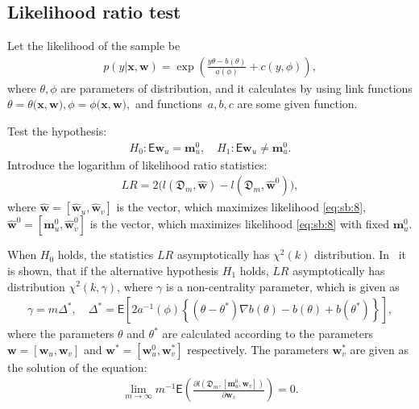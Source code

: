 \documentclass[
11pt,%
tightenlines,%
twoside,%
onecolumn,%
nofloats,%
nobibnotes,%
nofootinbib,%
superscriptaddress,%
noshowpacs,%
centertags]%
{revtex4}
\begin{document}
\subsection{Likelihood ratio test}\label{likelihood_test}
Let the likelihood of the sample be
\[
\label{eq:sb:8}
\begin{aligned}
	p(y|\mathbf{x},\textbf{w}) = \exp\left(\frac{y\theta- b(\theta)}{a(\phi)} + c\left(y, \phi\right)\right),
\end{aligned}
\]
where $\theta, \phi$ are parameters of distribution, and it calculates by using link functions $\theta=\theta\bigr(\textbf{x},\textbf{w}\bigr), \phi=\phi\bigr(\textbf{x},\textbf{w}\bigr),$ and functions~$a, b, c$ are some given function.

Test the hypothesis:
\[
\label{eq:sb:9}
\begin{aligned}
	H_0: \mathsf{E}\textbf{w}_{u} = \textbf{m}^0_{u}, \quad H_1: \mathsf{E}\textbf{w}_{u} \not= \textbf{m}^0_{u}.
\end{aligned}
\]
Introduce the logarithm of likelihood ratio statistics:
\[
\label{eq:sb:10}
\begin{aligned}
	LR = 2\Big(l\left(\mathfrak{D}_m, \hat{\textbf{w}}\right) - l\left(\mathfrak{D}_m, \hat{\textbf{w}}^0\right)\Big),
\end{aligned}
\]
where $\hat{\textbf{w}} = [\hat{\textbf{w}}_{u},\hat{\textbf{w}}_{v}]$ is the vector, which maximizes likelihood \eqref{eq:sb:8}, $\hat{\textbf{w}}^{0} = [\textbf{m}^{0}_{u},\hat{\textbf{w}}^{0}_{v}]$ is the vector, which maximizes likelihood \eqref{eq:sb:8} with fixed $\textbf{m}^{0}_{u}$.
	
When $H_0$ holds, the statistics $LR$ asymptotically has $\chi^2(k)$ distribution. In~\cite{shieh2000} it is shown, that if the alternative hypothesis $H_1$ holds, $LR$ asymptotically has distribution $\chi^2(k,\gamma)$, where $\gamma$ is a non-centrality parameter, which is given as
\[
\label{eq:sb:11}
\begin{aligned}
	\gamma = m\Delta^*, \quad \Delta^* = \mathsf{E}\left[2a^{-1}(\phi)\left\{\left(\theta - \theta^*\right)\nabla b(\theta) - b(\theta) + b(\theta^*)\right\}\right], 
\end{aligned}
\]
where the parameters $\theta$ and $\theta^*$ are calculated according to the parameters $\textbf{w} = [\textbf{w}_{u}, \textbf{w}_{v}]$ and $\textbf{w}^* = [\textbf{w}^{0}_{u}, \textbf{w}^{*}_{v}]$ respectively. The parameters  $\textbf{w}^{*}_{v}$ are given as the solution of the equation:
\[
\label{eq:sb:12}
\begin{aligned}
	\lim_{m\to\infty}m^{-1}\mathsf{E}\left(\frac{\partial l\left(\mathfrak{D}_m, \left[\textbf{m}^{0}_{u}, \textbf{w}_{v}\right]\right)}{\partial \textbf{w}_{v}}\right) = 0.
\end{aligned}
\]
	
\end{document}
